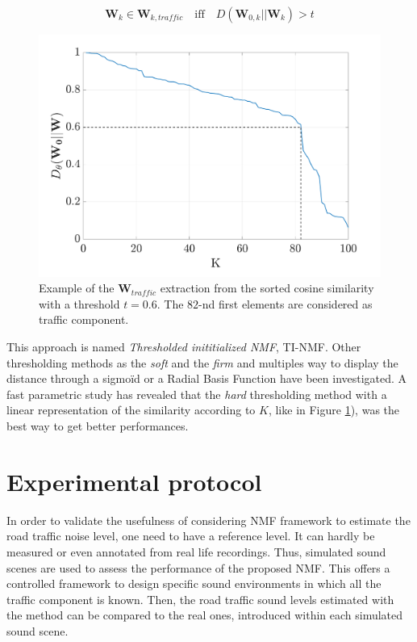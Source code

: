 \documentclass[twocolumn,a4paper,10pt]{article}
\begin{document}
\begin{equation}
\mathbf{W}_k \in \mathbf{W}_{k,traffic} \quad \text{iff} \quad D\left(\mathbf{W}_{0,k} \vert \vert \mathbf{W}_{k} \right) > t
\end{equation}

\begin{figure}[hbtp]
\centering
\includegraphics[width=0.8\linewidth]{figures/distanceCosLinDisplay.pdf}
\caption{Example of the $\mathbf{W}_{traffic}$ extraction from the sorted cosine similarity with a threshold $t = 0.6$. The $82$-nd first elements are considered as traffic component.}
\label{fig:W_ThC_NMF}
\end{figure}

This approach is named \textit{Thresholded inititialized NMF}, TI-NMF. Other thresholding methods as the \textit{soft} \cite{donoho1995noising}and the \textit{firm} \cite{fornasier2008iterative} and multiples way to display the distance through a sigmoïd or a Radial Basis Function have been investigated. A fast parametric study has revealed that the \textit{hard} thresholding method  with a linear representation of the similarity according to $K$, like in  Figure \ref{fig:W_ThC_NMF}), was the best way to get better performances.


\section{Experimental protocol}\label{part:protocol}

In order to validate the usefulness of considering NMF framework to estimate the road traffic noise level, one need to have a reference level. It can hardly be measured or even annotated from real life recordings. Thus,  simulated sound scenes are used to assess the performance of the proposed NMF. This offers a controlled framework to design specific sound environments in which all the traffic component is known. Then, the road traffic sound levels estimated with the method can be compared to the real ones, introduced within each simulated sound scene.
\end{document}

